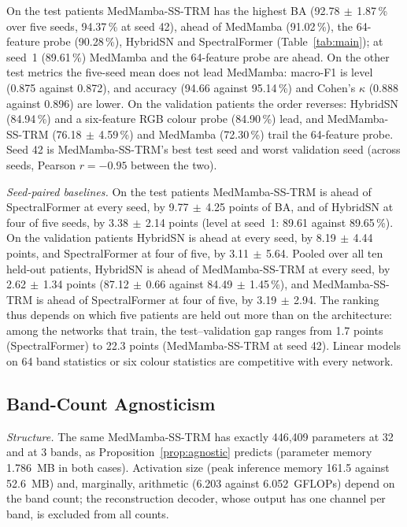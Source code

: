 \documentclass{svproc}
\newcommand{\ms}{\ensuremath{\,\pm\,}}   %
\begin{document}
On the test patients MedMamba-SS-TRM has the highest BA (92.78\ms1.87\,\% over five seeds, 94.37\,\% at seed 42), ahead of MedMamba (91.02\,\%), the 64-feature probe (90.28\,\%), HybridSN and SpectralFormer (Table~\ref{tab:main}); at seed~1 (89.61\,\%) MedMamba and the 64-feature probe are ahead. On the other test metrics the five-seed mean does not lead MedMamba: macro-F1 is level (0.875 against 0.872), and accuracy (94.66 against 95.14\,\%) and Cohen's $\kappa$ (0.888 against 0.896) are lower. On the validation patients the order reverses: HybridSN (84.94\,\%) and a six-feature RGB colour probe (84.90\,\%) lead, and MedMamba-SS-TRM (76.18\ms4.59\,\%) and MedMamba (72.30\,\%) trail the 64-feature probe. Seed 42 is MedMamba-SS-TRM's best test seed and worst validation seed (across seeds, Pearson $r = -0.95$ between the two).

\emph{Seed-paired baselines.} On the test patients MedMamba-SS-TRM is ahead of SpectralFormer at every seed, by 9.77\ms4.25 points of BA, and of HybridSN at four of five seeds, by 3.38\ms2.14 points (level at seed~1: 89.61 against 89.65\,\%). On the validation patients HybridSN is ahead at every seed, by 8.19\ms4.44 points, and SpectralFormer at four of five, by 3.11\ms5.64. Pooled over all ten held-out patients, HybridSN is ahead of MedMamba-SS-TRM at every seed, by 2.62\ms1.34 points (87.12\ms0.66 against 84.49\ms1.45\,\%), and MedMamba-SS-TRM is ahead of SpectralFormer at four of five, by 3.19\ms2.94. The ranking thus depends on which five patients are held out more than on the architecture: among the networks that train, the test--validation gap ranges from 1.7 points (SpectralFormer) to 22.3 points (MedMamba-SS-TRM at seed 42). Linear models on 64 band statistics or six colour statistics are competitive with every network.

\subsection{Band-Count Agnosticism}\label{sec:bands}
\emph{Structure.} The same MedMamba-SS-TRM has exactly 446,409 parameters at 32 and at 3 bands, as Proposition~\ref{prop:agnostic} predicts (parameter memory 1.786~MB in both cases). Activation size (peak inference memory 161.5 against 52.6~MB) and, marginally, arithmetic (6.203 against 6.052~GFLOPs) depend on the band count; the reconstruction decoder, whose output has one channel per band, is excluded from all counts.
\end{document}
